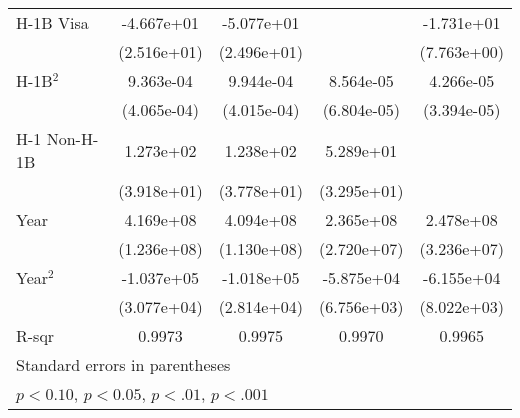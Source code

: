 \begin{tabular}{l*{4}{c}}
    \addlinespace
    H-1B Visa                &  -4.667e+01\sym{+} &  -5.077e+01\sym{+} &                    &  -1.731e+01\sym{++}\\
                             & (2.516e+01)        & (2.496e+01)        &                    & (7.763e+00)        \\
    \addlinespace
    H-1B$^2$                   &   9.363e-04\sym{++}&   9.944e-04\sym{++}&   8.564e-05        &   4.266e-05        \\
                             & (4.065e-04)        & (4.015e-04)        & (6.804e-05)        & (3.394e-05)        \\
    \addlinespace
    H-1 Non-H-1B             &   1.273e+02\sym{*} &   1.238e+02\sym{*} &   5.289e+01        &                    \\
                             & (3.918e+01)        & (3.778e+01)        & (3.295e+01)        &                    \\
    \addlinespace
    Year                     &   4.169e+08\sym{*} &   4.094e+08\sym{*} &   2.365e+08\sym{**}&   2.478e+08\sym{**}\\
                             & (1.236e+08)        & (1.130e+08)        & (2.720e+07)        & (3.236e+07)        \\
    \addlinespace
    Year$^2$                   &  -1.037e+05\sym{*} &  -1.018e+05\sym{*} &  -5.875e+04\sym{**}&  -6.155e+04\sym{**}\\
                             & (3.077e+04)        & (2.814e+04)        & (6.756e+03)        & (8.022e+03)        \\
    \midrule
    R-sqr                    &      0.9973        &      0.9975        &      0.9970        &      0.9965        \\
    \bottomrule
    \multicolumn{5}{l}{\footnotesize Standard errors in parentheses}\\
    \multicolumn{5}{l}{\footnotesize \sym{+} \(p<0.10\), \sym{++} \(p<0.05\), \sym{*} \(p<.01\), \sym{**} \(p<.001\)}\\
    \end{tabular}